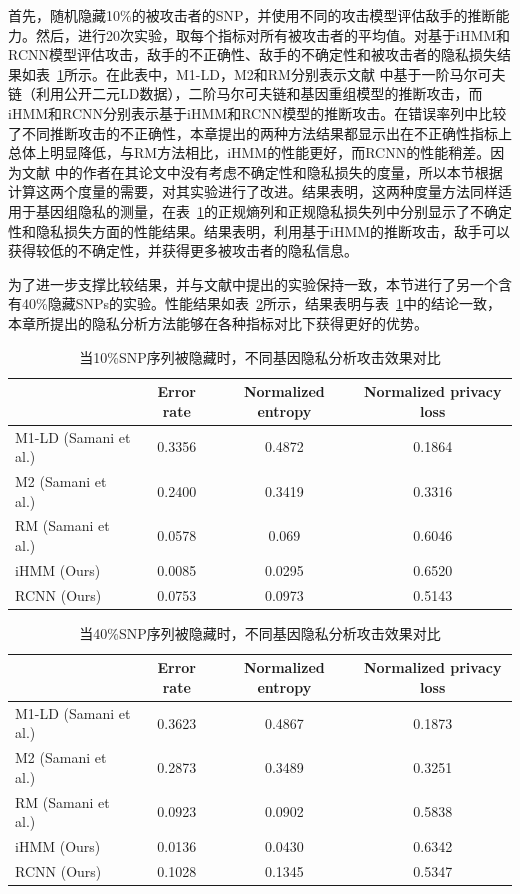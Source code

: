 首先，随机隐藏10\%的被攻击者的SNP，并使用不同的攻击模型评估敌手的推断能力。然后，进行20次实验，取每个指标对所有被攻击者的平均值。对基于iHMM和RCNN模型评估攻击，敌手的不正确性、敌手的不确定性和被攻击者的隐私损失结果如表~\ref{tab:performance-10per}所示。在此表中，M1-LD，M2和RM分别表示文献\cite{samani2015quantifying} 中基于一阶马尔可夫链（利用公开二元LD数据），二阶马尔可夫链和基因重组模型的推断攻击，而iHMM和RCNN分别表示基于iHMM和RCNN模型的推断攻击。在错误率列中比较了不同推断攻击的不正确性，本章提出的两种方法结果都显示出在不正确性指标上总体上明显降低，与RM方法相比，iHMM的性能更好，而RCNN的性能稍差。因为文献\cite{samani2015quantifying} 中的作者在其论文中没有考虑不确定性和隐私损失的度量，所以本节根据计算这两个度量的需要，对其实验进行了改进。结果表明，这两种度量方法同样适用于基因组隐私的测量，在表~\ref{tab:performance-10per}的正规熵列和正规隐私损失列中分别显示了不确定性和隐私损失方面的性能结果。结果表明，利用基于iHMM的推断攻击，敌手可以获得较低的不确定性，并获得更多被攻击者的隐私信息。

为了进一步支撑比较结果，并与文献\cite{samani2015quantifying}中提出的实验保持一致，本节进行了另一个含有40\%隐藏SNPs的实验。性能结果如表~\ref{tab:performance-40per}所示，结果表明与表~\ref{tab:performance-10per}中的结论一致，本章所提出的隐私分析方法能够在各种指标对比下获得更好的优势。

\begin{table}[htbp]
	\caption{当10\%SNP序列被隐藏时，不同基因隐私分析攻击效果对比}
	\label{tab:performance-10per}
	\begin{tabular}{lccc}
		\hline
		& Error rate & Normalized entropy & Normalized privacy loss\\
		\hline
		M1-LD (Samani et al.) & 0.3356  & 0.4872 & 0.1864 \\
		M2 (Samani et al.)    & 0.2400  & 0.3419 & 0.3316\\
		RM (Samani et al.)    &  0.0578 & 0.069 & 0.6046 \\
		iHMM (Ours)          & 0.0085  &0.0295 & 0.6520 \\
		RCNN (Ours)          & 0.0753  &0.0973 & 0.5143\\
		\hline
	\end{tabular}
\end{table}


\begin{table}[htbp]
	\caption{当40\%SNP序列被隐藏时，不同基因隐私分析攻击效果对比}
	\label{tab:performance-40per}
	\begin{tabular}{lccc}
		\hline
		& Error rate & Normalized entropy & Normalized privacy loss \\
		\hline
		M1-LD (Samani et al.) & 0.3623 & 0.4867 & 0.1873 \\
		M2 (Samani et al.)    & 0.2873 & 0.3489 & 0.3251 \\
		RM (Samani et al.)    & 0.0923 & 0.0902 & 0.5838 \\
		iHMM (Ours)          & 0.0136 & 0.0430 & 0.6342 \\
		RCNN (Ours)          & 0.1028 & 0.1345 & 0.5347\\
		\hline
	\end{tabular}
\end{table}

